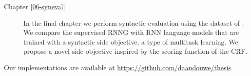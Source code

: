 \begin{description}
    \item[Chapter \ref{06-syneval}]
      In the final chapter we perform syntactic evaluation using the dataset of \citet{linzen2018targeted}. We compare the supervised RNNG with RNN language models that are trained with a syntactic side objective, a type of multitask learning. We propose a novel side objective inspired by the scoring function of the CRF.

  \end{description}



Our implementations are available at \url{https://github.com/daandouwe/thesis}.
